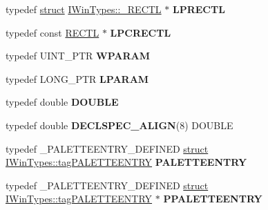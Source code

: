 \begin{DoxyCompactItemize}
\item 
\mbox{\label{interface_i_win_types_aadec913223ac711061f502e200511361}} 
typedef \hyperlink{interfacestruct}{struct} \hyperlink{struct_i_win_types_1_1___r_e_c_t_l}{I\+Win\+Types\+::\+\_\+\+R\+E\+C\+TL} $\ast$ {\bfseries L\+P\+R\+E\+C\+TL}
\item 
\mbox{\label{interface_i_win_types_aa421211eda7af12de17b92ba2e6013cf}} 
typedef const \hyperlink{struct_i_win_types_1_1___r_e_c_t_l}{R\+E\+C\+TL} $\ast$ {\bfseries L\+P\+C\+R\+E\+C\+TL}
\item 
\mbox{\label{interface_i_win_types_acfd4aa9fc66fd206e4667b4989aa46c7}} 
typedef U\+I\+N\+T\+\_\+\+P\+TR {\bfseries W\+P\+A\+R\+AM}
\item 
\mbox{\label{interface_i_win_types_a4081c6a02348d93086958a3e519e79c2}} 
typedef L\+O\+N\+G\+\_\+\+P\+TR {\bfseries L\+P\+A\+R\+AM}
\item 
\mbox{\label{interface_i_win_types_aa7ece2a8112e1eab0dc1e2dcbe7fdef0}} 
typedef double {\bfseries D\+O\+U\+B\+LE}
\item 
\mbox{\label{interface_i_win_types_a14078eceff54658bbd2c3337b9af3a8b}} 
typedef double {\bfseries D\+E\+C\+L\+S\+P\+E\+C\+\_\+\+A\+L\+I\+GN}(8) D\+O\+U\+B\+LE
\item 
\mbox{\label{interface_i_win_types_a6c903346899218f2de378986202ec86f}} 
typedef \+\_\+\+P\+A\+L\+E\+T\+T\+E\+E\+N\+T\+R\+Y\+\_\+\+D\+E\+F\+I\+N\+ED \hyperlink{interfacestruct}{struct} \hyperlink{struct_i_win_types_1_1tag_p_a_l_e_t_t_e_e_n_t_r_y}{I\+Win\+Types\+::tag\+P\+A\+L\+E\+T\+T\+E\+E\+N\+T\+RY} {\bfseries P\+A\+L\+E\+T\+T\+E\+E\+N\+T\+RY}
\item 
\mbox{\label{interface_i_win_types_ac65cab558f751ce84fb6cf93774a9404}} 
typedef \+\_\+\+P\+A\+L\+E\+T\+T\+E\+E\+N\+T\+R\+Y\+\_\+\+D\+E\+F\+I\+N\+ED \hyperlink{interfacestruct}{struct} \hyperlink{struct_i_win_types_1_1tag_p_a_l_e_t_t_e_e_n_t_r_y}{I\+Win\+Types\+::tag\+P\+A\+L\+E\+T\+T\+E\+E\+N\+T\+RY} $\ast$ {\bfseries P\+P\+A\+L\+E\+T\+T\+E\+E\+N\+T\+RY}
\item 

\end{DoxyCompactItemize}
